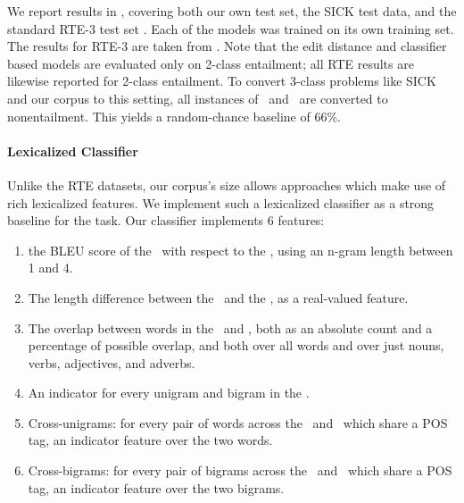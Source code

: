 We report results in , covering both our own test set,
  the SICK test data, and the standard RTE-3 test set \cite{giampiccolo2007third}.
Each of the models was trained on its own training set.
The results for RTE-3 are taken from .
Note that the edit distance and classifier based models are evaluated only on
  2-class entailment; all RTE results are likewise reported for 2-class entailment.
To convert 3-class problems like SICK and our corpus to this setting, all instances
  of \contradiction\ and \unknown\ are converted to nonentailment.
This yields a random-chance baseline of 66\%.


%
%
\paragraph{Lexicalized Classifier}
Unlike the RTE datasets, our corpus's size allows approaches which make use of
  rich lexicalized features.
We implement such a lexicalized classifier as a strong baseline 
  for the task.
Our classifier implements 6 features:
\begin{enumerate}
\setlength\itemsep{-0.25em}
  \item the BLEU score of the \hypothesis\ with respect
  to the \premise, using an n-gram length between 1 and 4.

  \item The length difference between the \hypothesis\ and the \premise, as a real-valued
  feature.

  \item The overlap between words in the \premise\ and \hypothesis,
  both as an absolute count and a percentage of possible overlap, and both over 
  all words and over just nouns, verbs, adjectives, 
  and adverbs.
  
  \item\label{lst:ngram} An indicator for every unigram and bigram in the \hypothesis.

  \item\label{lst:unigram} Cross-unigrams: for every pair of words across the \premise\ and \hypothesis\ which share a 
  POS tag, an indicator feature over the two words.
  
  \item\label{lst:bigram} Cross-bigrams: for every pair of bigrams across the \premise\ and \hypothesis\ which share a 
  POS tag, an indicator feature over the two bigrams.
\end{enumerate}

